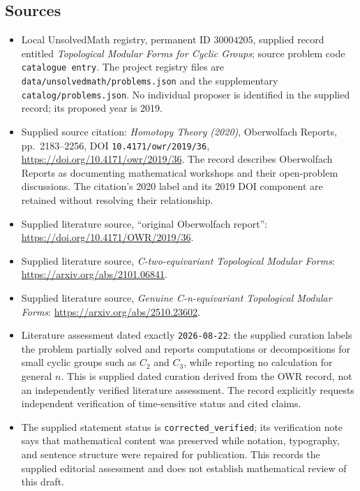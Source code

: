 \documentclass[11pt]{article}
\begin{document}
\subsection{Sources}
\begin{itemize}
\item Local UnsolvedMath registry, permanent ID \(30004205\), supplied record entitled \emph{Topological Modular Forms for Cyclic Groups}; source problem code \texttt{catalogue entry}. The project registry files are \texttt{data/unsolvedmath/problems.json} and the supplementary \texttt{catalog/problems.json}. No individual proposer is identified in the supplied record; its proposed year is 2019.
\item Supplied source citation: \emph{Homotopy Theory (2020)}, Oberwolfach Reports, pp.\ 2183--2256, DOI \texttt{10.4171/owr/2019/36}, \url{https://doi.org/10.4171/owr/2019/36}. The record describes Oberwolfach Reports as documenting mathematical workshops and their open-problem discussions. The citation's 2020 label and its 2019 DOI component are retained without resolving their relationship.
\item Supplied literature source, ``original Oberwolfach report'': \url{https://doi.org/10.4171/OWR/2019/36}.
\item Supplied literature source, \emph{C-two-equivariant Topological Modular Forms}: \url{https://arxiv.org/abs/2101.06841}.
\item Supplied literature source, \emph{Genuine C-n-equivariant Topological Modular Forms}: \url{https://arxiv.org/abs/2510.23602}.
\item Literature assessment dated exactly \texttt{2026-08-22}: the supplied curation labels the problem partially solved and reports computations or decompositions for small cyclic groups such as \(C_2\) and \(C_3\), while reporting no calculation for general \(n\). This is supplied dated curation derived from the OWR record, not an independently verified literature assessment. The record explicitly requests independent verification of time-sensitive status and cited claims.
\item The supplied statement status is \texttt{corrected\_verified}; its verification note says that mathematical content was preserved while notation, typography, and sentence structure were repaired for publication. This records the supplied editorial assessment and does not establish mathematical review of this draft.
\end{itemize}
\end{document}
